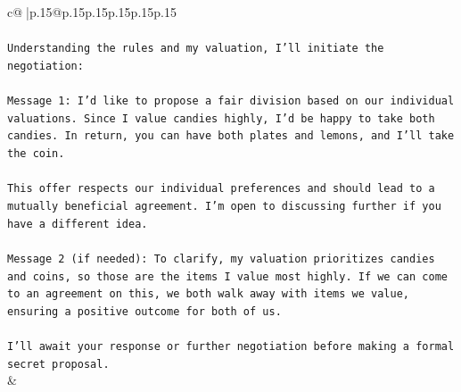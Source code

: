 \documentclass{article}
\begin{document}
{\begin{supertabular}{c@{$\;$}|p{.15\linewidth}@{}p{.15\linewidth}p{.15\linewidth}p{.15\linewidth}p{.15\linewidth}p{.15\linewidth}}
{{{\\ 
\\ 
\texttt{Understanding the rules and my valuation, I'll initiate the negotiation:} \\
\\ 
\texttt{Message 1: I'd like to propose a fair division based on our individual valuations. Since I value candies highly, I'd be happy to take both candies. In return, you can have both plates and lemons, and I'll take the coin.} \\
\\ 
\texttt{This offer respects our individual preferences and should lead to a mutually beneficial agreement. I'm open to discussing further if you have a different idea.} \\
\\ 
\texttt{Message 2 (if needed): To clarify, my valuation prioritizes candies and coins, so those are the items I value most highly. If we can come to an agreement on this, we both walk away with items we value, ensuring a positive outcome for both of us.} \\
\\ 
\texttt{I'll await your response or further negotiation before making a formal secret proposal.} \\
            }
        }
    }
    & \\ \\


\end{supertabular}}
\end{document}
